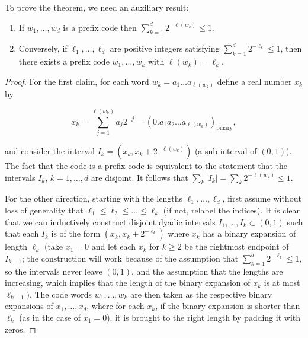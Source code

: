 \noindent To prove the theorem, we need an auxiliary result:

\begin{thm}

\begin{enumerate}[label=\arabic*.]
\item If $w_1,\ldots,w_d$ is a prefix code then
$\sum_{k=1}^d 2^{-\ell(w_k)} \le 1$.

\item Conversely, if $\ell_1,\ldots,\ell_d$ are positive
integers satisfying $\sum_{k=1}^d 2^{-\ell_k} \le 1$,
then there exists a prefix code $w_1,\ldots,w_k$ with
$\ell(w_k)=\ell_k$.
\end{enumerate}

\end{thm}

\begin{proof}
For the first claim, for each word
$w_k=a_1\ldots a_{\ell(w_k)}$ define a real number
$x_k$ by

\[
x_k = \sum_{j=1}^{\ell(w_k)} a_j 2^{-j} = (0.a_1a_2\ldots a_{\ell(w_k)})_{\textrm{binary}},
\]

\noindent and consider the interval
$I_k = (x_k,x_k+2^{-\ell(w_k)})$ (a sub-interval of
$(0,1)$). The fact that the code is a prefix code is
equivalent to the statement that the intervals $I_k$,
$k=1,\ldots,d$ are disjoint. It follows that
$\sum_k |I_k| = \sum_k 2^{-\ell(w_k)} \le 1$.

For the other direction, starting with the lengths
$\ell_1,\ldots,\ell_d$, first assume without loss of
generality that
$\ell_1\le \ell_2\le \ldots \le \ell_k$ (if not,
relabel the indices). It is clear that we can
inductively construct disjoint dyadic intervals
$I_1,\ldots,I_k \subset (0,1)$ such that each $I_k$
is of the form $(x_k,x_k+2^{-\ell_k})$ where $x_k$
has a binary expansion of length $\ell_k$ (take
$x_1=0$ and let each $x_k$ for $k\ge 2$ be the
rightmost endpoint of $I_{k-1}$; the construction
will work because of the assumption that
$\sum_{k=1}^d 2^{-\ell_k} \le 1$, so the intervals
never leave $(0,1)$, and the assumption that the
lengths are increasing, which implies that the length
of the binary expansion of $x_k$ is at most
$\ell_{k-1}$). The code words $w_1,\ldots,w_k$ are
then taken as the respective binary expansions of
$x_1,\ldots,x_d$, where for each $x_k$, if the binary
expansion is shorter than $\ell_k$ (as in the case of
$x_1=0$), it is brought to the right length by
padding it with zeros.
\end{proof}

